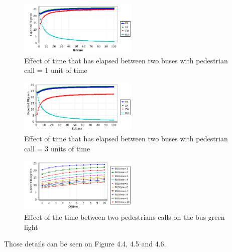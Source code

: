 \begin{figure}[H]\label{fig:cwfirst}
  \centering
    \includegraphics[width=0.5\textwidth]{picture/CWtime1.png}
    \caption{Effect of time that has elapsed between two buses with pedestrian call = 1 unit of time}
\end{figure}

\begin{figure}[H]\label{fig:cwthree}
  \centering
    \includegraphics[width=0.5\textwidth]{picture/CWtime3.png}
    \caption{Effect of time that has elapsed between two buses with pedestrian call = 3 units of time}
\end{figure}

\begin{figure}[H]\label{fig:busbus}
  \centering
    \includegraphics[width=0.5\textwidth]{picture/CWtimeOnBUS.png}
    \caption{Effect of the time between two pedestrians calls on the bus green light}
\end{figure}

Those details can be seen on Figure 4.4, 4.5 and 4.6.